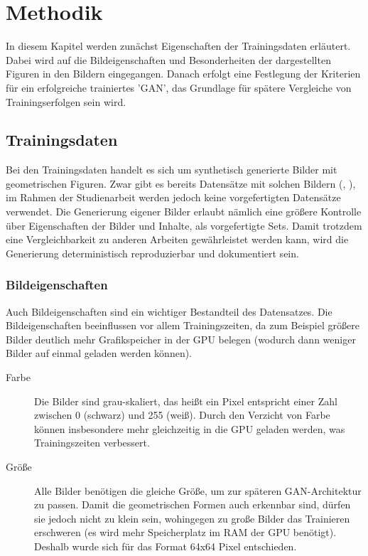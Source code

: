 \chapter{Methodik}
In diesem Kapitel werden zunächst Eigenschaften der Trainingsdaten erläutert.
Dabei wird auf die Bildeigenschaften und Besonderheiten der dargestellten Figuren in den Bildern eingegangen.
Danach erfolgt eine Festlegung der Kriterien für ein erfolgreiche trainiertes 'GAN', das Grundlage für spätere Vergleiche von Trainingserfolgen sein wird.

\section{Trainingsdaten}
Bei den Trainingsdaten handelt es sich um synthetisch generierte Bilder mit geometrischen Figuren.
Zwar gibt es bereits Datensätze mit solchen Bildern (\cite{dataset:four-shapes}, \cite{dataset:2d-geometric-shapes-dataset}), im Rahmen der Studienarbeit werden jedoch keine vorgefertigten Datensätze verwendet.
Die Generierung eigener Bilder erlaubt nämlich eine größere Kontrolle über Eigenschaften der Bilder und Inhalte, als vorgefertigte Sets.
Damit trotzdem eine Vergleichbarkeit zu anderen Arbeiten gewährleistet werden kann, wird die Generierung deterministisch reproduzierbar und dokumentiert sein.

\subsection{Bildeigenschaften}
Auch Bildeigenschaften sind ein wichtiger Bestandteil des Datensatzes.
Die Bildeigenschaften beeinflussen vor allem Trainingszeiten, da zum Beispiel größere Bilder deutlich mehr Grafikspeicher in der GPU belegen (wodurch dann weniger Bilder auf einmal geladen werden können).

\begin{description}
	\item[Farbe]
	Die Bilder sind grau-skaliert, das heißt ein Pixel entspricht einer Zahl zwischen 0 (schwarz) und 255 (weiß).
	Durch den Verzicht von Farbe können insbesondere mehr gleichzeitig in die GPU geladen werden, was Trainingszeiten verbessert.
	
	\item[Größe]
	Alle Bilder benötigen die gleiche Größe, um zur späteren GAN-Architektur zu passen.
	Damit die geometrischen Formen auch erkennbar sind, dürfen sie jedoch nicht zu klein sein, wohingegen zu große Bilder das Trainieren erschweren (es wird mehr Speicherplatz im RAM der GPU benötigt).
	Deshalb wurde sich für das Format 64x64 Pixel entschieden.
\end{description}

